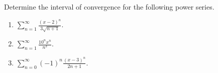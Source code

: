 Determine the interval of convergence for the following power series. 
\begin{enumerate}[ref={\fcProblemRef}]
\item \label{problemIntervalConvergence_sum(x-2)^n/(3sqrt(n+1))} $\displaystyle \sum_{n=1}^{\infty} \frac{(x-2)^n}{3\sqrt{n+1}}.$
\answer{$x\in [1, 3)$}
\item $\displaystyle \sum \limits_{n= 1}^{\infty} \frac{ 10^nx^n}{n^3}$.
\item $\displaystyle \sum\limits_{n=0}^{\infty}(-1)^n \frac{(x- 3)^n }{ 2n+1} $.
\answer{$x\in (2, 4]$}
\end{enumerate}